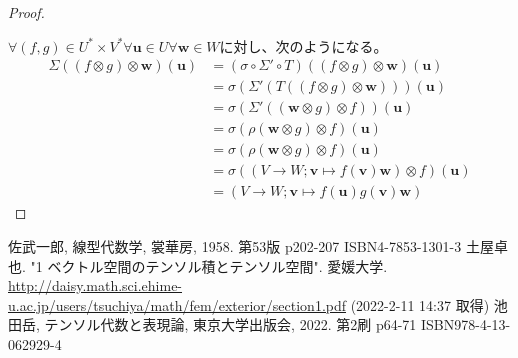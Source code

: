 \documentclass[dvipdfmx]{jsarticle}
\begin{document}
\begin{proof}
\begin{center}
\end{center}
$\forall(f,g) \in U^{*} \times V^{*}\forall\mathbf{u} \in U\forall\mathbf{w} \in W$に対し、次のようになる。
\begin{align*}
\varSigma\left( (f \otimes g) \otimes \mathbf{w} \right)\left( \mathbf{u} \right) &= \left( \sigma \circ \varSigma' \circ T \right)\left( (f \otimes g) \otimes \mathbf{w} \right)\left( \mathbf{u} \right)\\
&= \sigma\left( \varSigma'\left( T\left( (f \otimes g) \otimes \mathbf{w} \right) \right) \right)\left( \mathbf{u} \right)\\
&= \sigma\left( \varSigma'\left( \left( \mathbf{w} \otimes g \right) \otimes f \right) \right)\left( \mathbf{u} \right)\\
&= \sigma\left( \rho\left( \mathbf{w} \otimes g \right) \otimes f \right)\left( \mathbf{u} \right)\\
&= \sigma\left( \rho\left( \mathbf{w} \otimes g \right) \otimes f \right)\left( \mathbf{u} \right)\\
&= \sigma\left( \left( V \rightarrow W;\mathbf{v} \mapsto f\left( \mathbf{v} \right)\mathbf{w} \right) \otimes f \right)\left( \mathbf{u} \right)\\
&= \left( V \rightarrow W;\mathbf{v} \mapsto f\left( \mathbf{u} \right)g\left( \mathbf{v} \right)\mathbf{w} \right)
\end{align*}
\end{proof}
\begin{thebibliography}{50}
  佐武一郎, 線型代数学, 裳華房, 1958. 第53版 p202-207 ISBN4-7853-1301-3
  土屋卓也. "1 ベクトル空間のテンソル積とテンソル空間". 愛媛大学. \url{http://daisy.math.sci.ehime-u.ac.jp/users/tsuchiya/math/fem/exterior/section1.pdf} (2022-2-11 14:37 取得)
  池田岳, テンソル代数と表現論, 東京大学出版会, 2022. 第2刷 p64-71 ISBN978-4-13-062929-4
\end{thebibliography}
\end{document}
